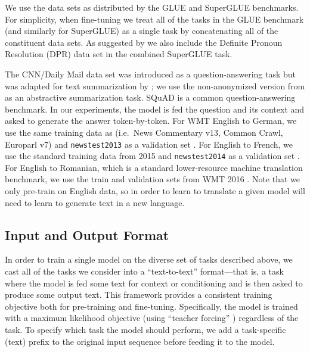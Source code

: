 We use the data sets as distributed by the GLUE and SuperGLUE benchmarks. For simplicity, when fine-tuning we treat all of the tasks in the GLUE benchmark (and similarly for SuperGLUE) as a single task by concatenating all of the constituent data sets. As suggested by \cite{kocijan2019surprisingly} we also include the Definite Pronoun Resolution (DPR) data set \citep{rahman2012resolving} in the combined SuperGLUE task.

The CNN/Daily Mail \citep{hermann2015teaching} data set was introduced as a question-answering task but was adapted for text summarization by  \citet{nallapati2016abstractive}; we use the non-anonymized version from \citet{see2017get} as an abstractive summarization task. SQuAD \citep{rajpurkar2016squad} is a common question-answering benchmark. In our experiments, the model is fed the question and its context and asked to generate the answer token-by-token. For WMT English to German, we use the same training data as \citep{vaswani2017attention} (i.e.\ News Commentary v13, Common Crawl, Europarl v7) and \texttt{newstest2013} as a validation set \citep{bojar2014findings}. For English to French, we use the standard training data from 2015 and \texttt{newstest2014} as a validation set \citep{bojar2015findings}. For English to Romanian, which is a standard lower-resource machine translation benchmark, we use the train and validation sets from WMT 2016 \citep{bojar2016findings}. Note that we only pre-train on English data, so in order to learn to translate a given model will need to learn to generate text in a new language.

\subsection{Input and Output Format}
\label{sec:format}

In order to train a single model on the diverse set of tasks described above, we cast all of the tasks we consider into a ``text-to-text'' format---that is, a task where the model is fed some text for context or conditioning and is then asked to produce some output text. This framework provides a consistent training objective both for pre-training and fine-tuning. Specifically, the model is trained with a maximum likelihood objective (using ``teacher forcing'' \citep{williams1989learning}) regardless of the task. To specify which task the model should perform, we add a task-specific (text) prefix to the original input sequence before feeding it to the model.

